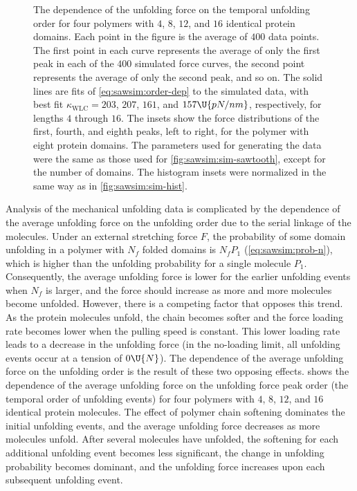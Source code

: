 \begin{figure}
  \begin{center}
  \caption{The dependence of the unfolding force on the temporal
    unfolding order for four polymers with $4$, $8$, $12$, and $16$
    identical protein domains.  Each point in the figure is the
    average of $400$ data points.  The first point in each curve
    represents the average of only the first peak in each of the $400$
    simulated force curves, the second point represents the average of
    only the second peak, and so on.  The solid lines are fits of
    \cref{eq:sawsim:order-dep} to the simulated data, with best fit
    $\kappa_\text{WLC}=203$, $207$, $161$, and $157\U{pN/nm}$,
    respectively, for lengths $4$ through $16$.  The insets show the
    force distributions of the first, fourth, and eighth peaks, left
    to right, for the polymer with eight protein domains.  The
    parameters used for generating the data were the same as those
    used for \cref{fig:sawsim:sim-sawtooth}, except for the number of
    domains.  The histogram insets were normalized in the same way as
    in \cref{fig:sawsim:sim-hist}.\label{fig:sawsim:order-dep}}
  \end{center}
\end{figure}

Analysis of the mechanical unfolding data is complicated by the
dependence of the average unfolding force on the unfolding order due
to the serial linkage of the molecules.  Under an external stretching
force $F$, the probability of some domain unfolding in a polymer with
$N_f$ folded domains is $N_fP_1$ (\cref{eq:sawsim:prob-n}), which is
higher than the unfolding probability for a single molecule $P_1$.
Consequently, the average unfolding force is lower for the earlier
unfolding events when $N_f$ is larger, and the force should increase
as more and more molecules become unfolded.  However, there is a
competing factor that opposes this trend.  As the protein molecules
unfold, the chain becomes softer and the force loading rate becomes
lower when the pulling speed is constant.  This lower loading rate
leads to a decrease in the unfolding force (in the no-loading limit,
all unfolding events occur at a tension of $0\U{N}$).  The dependence
of the average unfolding force on the unfolding order is the result of
these two opposing effects.   shows the
dependence of the average unfolding force on the unfolding force peak
order (the temporal order of unfolding events) for four polymers with
$4$, $8$, $12$, and $16$ identical protein molecules.  The effect of
polymer chain softening dominates the initial unfolding events, and
the average unfolding force decreases as more molecules unfold.  After
several molecules have unfolded, the softening for each additional
unfolding event becomes less significant, the change in unfolding
probability becomes dominant, and the unfolding force increases upon
each subsequent unfolding event\citep{zinober02}.
%

